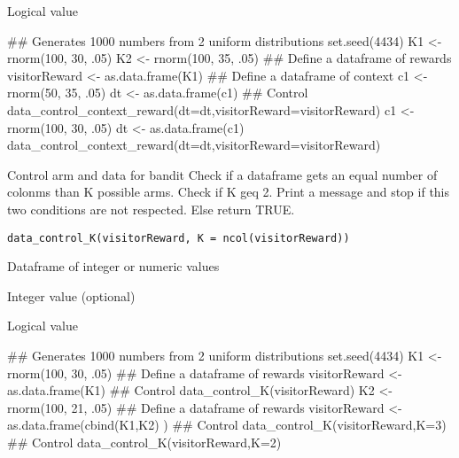 \documentclass[letterpaper]{book}
\begin{document}
%
\begin{Value}
Logical value
\end{Value}
%
\begin{Examples}
\begin{ExampleCode}
## Generates 1000 numbers from 2 uniform distributions
set.seed(4434)
K1 <- rnorm(100, 30, .05)
K2 <- rnorm(100, 35, .05)
## Define a dataframe of rewards
visitorReward <- as.data.frame(K1)
## Define a dataframe of context
c1 <- rnorm(50, 35, .05)
dt <- as.data.frame(c1)
## Control
data_control_context_reward(dt=dt,visitorReward=visitorReward)
c1 <- rnorm(100, 30, .05)
dt <- as.data.frame(c1)
data_control_context_reward(dt=dt,visitorReward=visitorReward)

\end{ExampleCode}
\end{Examples}
%
\begin{Description}\relax
Control arm and data for bandit
Check if a dataframe gets an equal number of colonms than K possible arms.
Check if K geq 2. Print a message  and stop if this two conditions are not respected.
Else return TRUE.
\end{Description}
%
\begin{Usage}
\begin{verbatim}
data_control_K(visitorReward, K = ncol(visitorReward))
\end{verbatim}
\end{Usage}
%
\begin{Arguments}
\begin{ldescription}
\item[\code{visitorReward}] Dataframe of integer or numeric values

\item[\code{K}] Integer value (optional)
\end{ldescription}
\end{Arguments}
%
\begin{Value}
Logical value
\end{Value}
%
\begin{Examples}
\begin{ExampleCode}
## Generates 1000 numbers from 2 uniform distributions
set.seed(4434)
K1 <- rnorm(100, 30, .05)
## Define a dataframe of rewards
visitorReward <- as.data.frame(K1)
## Control
data_control_K(visitorReward)
K2 <- rnorm(100, 21, .05)
## Define a dataframe of rewards
visitorReward <- as.data.frame(cbind(K1,K2) )
## Control
data_control_K(visitorReward,K=3)
## Control
data_control_K(visitorReward,K=2)

\end{ExampleCode}
\end{Examples}
\end{document}
